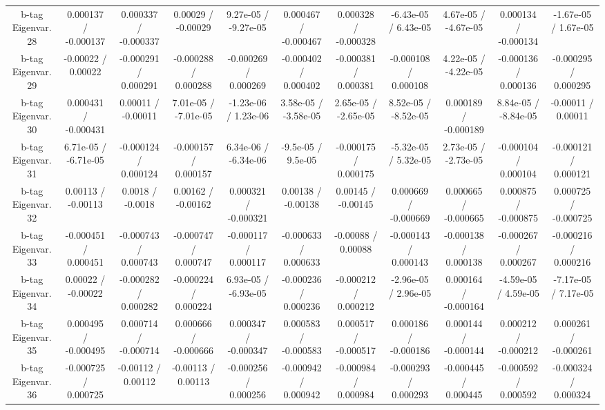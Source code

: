 \begin{table}[htbp]
\begin{center}
\begin{tabular}{|c|c|c|c|c|c|c|c|c|c|c|}
  b-tag Eigenvar. 28 & 0.000137 / -0.000137 & 0.000337 / -0.000337 & 0.00029 / -0.00029 & 9.27e-05 / -9.27e-05 & 0.000467 / -0.000467 & 0.000328 / -0.000328 & -6.43e-05 / 6.43e-05 & 4.67e-05 / -4.67e-05 & 0.000134 / -0.000134 & -1.67e-05 / 1.67e-05 \\ 
  b-tag Eigenvar. 29 & -0.00022 / 0.00022 & -0.000291 / 0.000291 & -0.000288 / 0.000288 & -0.000269 / 0.000269 & -0.000402 / 0.000402 & -0.000381 / 0.000381 & -0.000108 / 0.000108 & 4.22e-05 / -4.22e-05 & -0.000136 / 0.000136 & -0.000295 / 0.000295 \\ 
  b-tag Eigenvar. 30 & 0.000431 / -0.000431 & 0.00011 / -0.00011 & 7.01e-05 / -7.01e-05 & -1.23e-06 / 1.23e-06 & 3.58e-05 / -3.58e-05 & 2.65e-05 / -2.65e-05 & 8.52e-05 / -8.52e-05 & 0.000189 / -0.000189 & 8.84e-05 / -8.84e-05 & -0.00011 / 0.00011 \\ 
  b-tag Eigenvar. 31 & 6.71e-05 / -6.71e-05 & -0.000124 / 0.000124 & -0.000157 / 0.000157 & 6.34e-06 / -6.34e-06 & -9.5e-05 / 9.5e-05 & -0.000175 / 0.000175 & -5.32e-05 / 5.32e-05 & 2.73e-05 / -2.73e-05 & -0.000104 / 0.000104 & -0.000121 / 0.000121 \\ 
  b-tag Eigenvar. 32 & 0.00113 / -0.00113 & 0.0018 / -0.0018 & 0.00162 / -0.00162 & 0.000321 / -0.000321 & 0.00138 / -0.00138 & 0.00145 / -0.00145 & 0.000669 / -0.000669 & 0.000665 / -0.000665 & 0.000875 / -0.000875 & 0.000725 / -0.000725 \\ 
  b-tag Eigenvar. 33 & -0.000451 / 0.000451 & -0.000743 / 0.000743 & -0.000747 / 0.000747 & -0.000117 / 0.000117 & -0.000633 / 0.000633 & -0.00088 / 0.00088 & -0.000143 / 0.000143 & -0.000138 / 0.000138 & -0.000267 / 0.000267 & -0.000216 / 0.000216 \\ 
  b-tag Eigenvar. 34 & 0.00022 / -0.00022 & -0.000282 / 0.000282 & -0.000224 / 0.000224 & 6.93e-05 / -6.93e-05 & -0.000236 / 0.000236 & -0.000212 / 0.000212 & -2.96e-05 / 2.96e-05 & 0.000164 / -0.000164 & -4.59e-05 / 4.59e-05 & -7.17e-05 / 7.17e-05 \\ 
  b-tag Eigenvar. 35 & 0.000495 / -0.000495 & 0.000714 / -0.000714 & 0.000666 / -0.000666 & 0.000347 / -0.000347 & 0.000583 / -0.000583 & 0.000517 / -0.000517 & 0.000186 / -0.000186 & 0.000144 / -0.000144 & 0.000212 / -0.000212 & 0.000261 / -0.000261 \\ 
  b-tag Eigenvar. 36 & -0.000725 / 0.000725 & -0.00112 / 0.00112 & -0.00113 / 0.00113 & -0.000256 / 0.000256 & -0.000942 / 0.000942 & -0.000984 / 0.000984 & -0.000293 / 0.000293 & -0.000445 / 0.000445 & -0.000592 / 0.000592 & -0.000324 / 0.000324 \\ 

\end{tabular}
\end{center}
\end{table}
